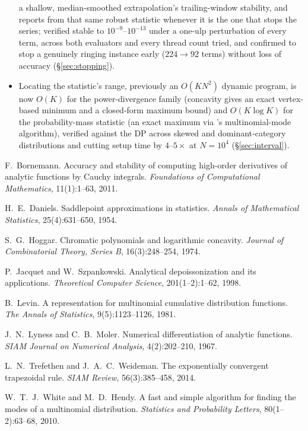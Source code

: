 \documentclass[11pt]{article}
\begin{document}
\begin{itemize}
        a shallow, median-smoothed extrapolation's trailing-window stability, and reports from that
        same robust statistic whenever it is the one that stops the series; verified stable to
        $10^{-9}$--$10^{-13}$ under a one-ulp perturbation of every term, across both evaluators and
        every thread count tried, and confirmed to stop a genuinely ringing instance early
        ($224\to92$ terms) without loss of accuracy (\S\ref{sec:stopping}).
  \item Locating the statistic's range, previously an $O(KN^2)$ dynamic program, is now $O(K)$ for
        the power-divergence family (concavity gives an exact vertex-based minimum and a
        closed-form maximum bound) and $O(K\log K)$ for the probability-mass statistic (an exact
        maximum via \citeauthor{whitehendy2010}'s multinomial-mode algorithm), verified against the
        DP across skewed and dominant-category distributions and cutting setup time by
        $4$--$5\times$ at $N=10^4$ (\S\ref{sec:interval}).
\end{itemize}

\begin{thebibliography}{9}

F.~Bornemann.
\newblock Accuracy and stability of computing high-order derivatives of analytic functions by
Cauchy integrals.
\newblock \emph{Foundations of Computational Mathematics}, 11(1):1--63, 2011.

H.~E.~Daniels.
\newblock Saddlepoint approximations in statistics.
\newblock \emph{Annals of Mathematical Statistics}, 25(4):631--650, 1954.

S.~G.~Hoggar.
\newblock Chromatic polynomials and logarithmic concavity.
\newblock \emph{Journal of Combinatorial Theory, Series B}, 16(3):248--254, 1974.

P.~Jacquet and W.~Szpankowski.
\newblock Analytical depoissonization and its applications.
\newblock \emph{Theoretical Computer Science}, 201(1--2):1--62, 1998.

B.~Levin.
\newblock A representation for multinomial cumulative distribution functions.
\newblock \emph{The Annals of Statistics}, 9(5):1123--1126, 1981.

J.~N.~Lyness and C.~B.~Moler.
\newblock Numerical differentiation of analytic functions.
\newblock \emph{SIAM Journal on Numerical Analysis}, 4(2):202--210, 1967.

L.~N.~Trefethen and J.~A.~C.~Weideman.
\newblock The exponentially convergent trapezoidal rule.
\newblock \emph{SIAM Review}, 56(3):385--458, 2014.

W.~T.~J.~White and M.~D.~Hendy.
\newblock A fast and simple algorithm for finding the modes of a multinomial distribution.
\newblock \emph{Statistics and Probability Letters}, 80(1--2):63--68, 2010.

\end{thebibliography}
\end{document}
